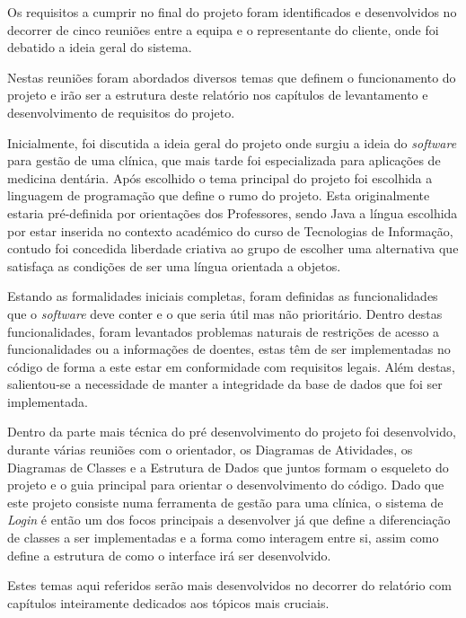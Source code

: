\documentclass[11pt,a4paper,twoside]{report}
\begin{document}
Os requisitos a cumprir no final do projeto foram identificados e desenvolvidos no decorrer de cinco reuniões entre a equipa e o representante do cliente, onde foi debatido a ideia geral do sistema.

Nestas reuniões foram abordados diversos temas que definem o funcionamento do projeto e irão ser a estrutura deste relatório nos capítulos de levantamento e desenvolvimento de requisitos do projeto.

Inicialmente, foi discutida a ideia geral do projeto onde surgiu a ideia do \textit{software} para gestão de uma clínica, que mais tarde foi especializada para aplicações de medicina dentária.
Após escolhido o tema principal do projeto foi escolhida a linguagem de programação que define o rumo do projeto.
Esta originalmente estaria pré-definida por orientações dos Professores, sendo Java a língua escolhida por estar inserida no contexto académico do curso de Tecnologias de Informação, contudo foi concedida liberdade criativa ao grupo de escolher uma alternativa que satisfaça as condições de ser uma língua orientada a objetos.

Estando as formalidades iniciais completas, foram definidas as funcionalidades que o \textit{software} deve conter e o que seria útil mas não prioritário.
Dentro destas funcionalidades, foram levantados problemas naturais de restrições de acesso a funcionalidades ou a informações de doentes, estas têm de ser implementadas no código de forma a este estar em conformidade com requisitos legais.
Além destas, salientou-se a necessidade de manter a integridade da base de dados que foi ser implementada.

Dentro da parte mais técnica do pré desenvolvimento do projeto foi desenvolvido, durante várias reuniões com o orientador, os Diagramas de Atividades, os Diagramas de Classes e a Estrutura de Dados que juntos formam o esqueleto do projeto e o guia principal para orientar o desenvolvimento do código.
Dado que este projeto consiste numa ferramenta de gestão para uma clínica, o sistema de \textit{Login} é então um dos focos principais a desenvolver já que define a diferenciação de classes a ser implementadas e a forma como interagem entre si, assim como define a estrutura de como o interface irá ser desenvolvido.

Estes temas aqui referidos serão mais desenvolvidos no decorrer do relatório com capítulos inteiramente dedicados aos tópicos mais cruciais.
\end{document}
